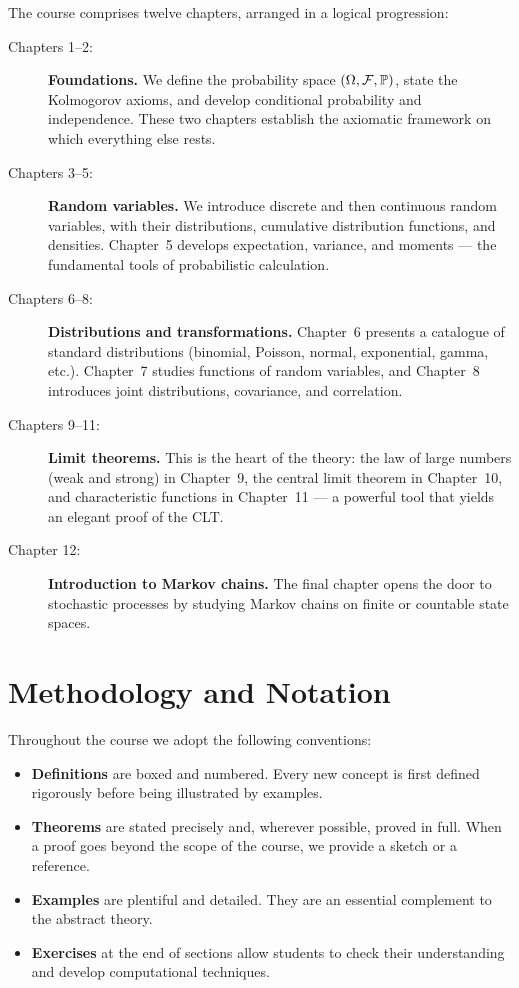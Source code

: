The course comprises twelve chapters, arranged in a logical progression:

\begin{description}
    \item[Chapters 1--2:] \textbf{Foundations.} We define the probability space
    $(\Omega, \mathcal{F}, \mathbb{P})$, state the Kolmogorov axioms, and develop
    conditional probability and independence. These two chapters establish the
    axiomatic framework on which everything else rests.

    \item[Chapters 3--5:] \textbf{Random variables.} We introduce discrete and then
    continuous random variables, with their distributions, cumulative distribution
    functions, and densities. Chapter~5 develops expectation, variance, and moments
    --- the fundamental tools of probabilistic calculation.

    \item[Chapters 6--8:] \textbf{Distributions and transformations.} Chapter~6
    presents a catalogue of standard distributions (binomial, Poisson, normal,
    exponential, gamma, etc.). Chapter~7 studies functions of random variables,
    and Chapter~8 introduces joint distributions, covariance, and correlation.

    \item[Chapters 9--11:] \textbf{Limit theorems.} This is the heart of the theory:
    the law of large numbers (weak and strong) in Chapter~9, the central limit
    theorem in Chapter~10, and characteristic functions in Chapter~11 --- a powerful
    tool that yields an elegant proof of the CLT.

    \item[Chapter 12:] \textbf{Introduction to Markov chains.} The final chapter
    opens the door to stochastic processes by studying Markov chains on finite or
    countable state spaces.
\end{description}

\section*{Methodology and Notation}

Throughout the course we adopt the following conventions:

\begin{itemize}
    \item \textbf{Definitions} are boxed and numbered. Every new concept is first
    defined rigorously before being illustrated by examples.

    \item \textbf{Theorems} are stated precisely and, wherever possible, proved in
    full. When a proof goes beyond the scope of the course, we provide a sketch or
    a reference.

    \item \textbf{Examples} are plentiful and detailed. They are an essential
    complement to the abstract theory.

    \item \textbf{Exercises} at the end of sections allow students to check their
    understanding and develop computational techniques.
\end{itemize}

